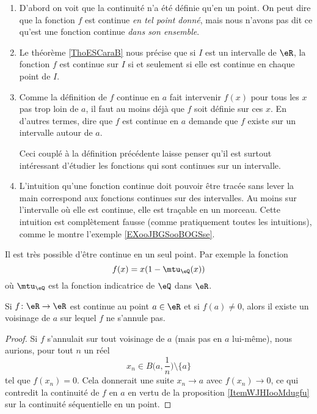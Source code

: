 \begin{enumerate}
	\item D'abord on voit que la continuité n'a été définie qu'en un point. On peut dire que la fonction \( f\) est continue \emph{en tel point donné}, mais nous n'avons pas dit ce qu'est une fonction continue \emph{dans son ensemble}.

	\item
	      Le théorème \ref{ThoESCaraB} nous précise que si \( I\) est un intervalle de \( \eR\), la fonction \( f\) est continue sur \( I\) si et seulement si elle est continue en chaque point de \( I\).

	\item Comme la définition de \( f\) continue en \( a\) fait intervenir \( f(x)\) pour tous les \( x\) pas trop loin de \( a\), il faut au moins déjà que \( f\) soit définie sur ces \( x\). En d'autres termes, dire que \( f\) est continue en \( a\) demande que \( f\) existe sur un intervalle autour de \( a\).

	      Ceci couplé à la définition précédente laisse penser qu'il est surtout intéressant d'étudier les fonctions qui sont continues sur un intervalle.

      \item L'intuition qu'une fonction continue doit pouvoir être tracée sans lever la main correspond aux fonctions continues sur des intervalles. Au moins sur l'intervalle où elle est continue, elle est traçable en un morceau. Cette intuition est complètement fausse (comme pratiquement toutes les intuitions), comme le montre l'exemple \ref{EXooJBGSooBOGSse}.
\end{enumerate}

\begin{example}     \label{EXooJBGSooBOGSse}
	Il est très possible d'être continue en un seul point. Par exemple la fonction
	\begin{equation}
		f(x)=x(1-\mtu_{\eQ}(x))
	\end{equation}
	où \( \mtu_{\eQ}\) est la fonction indicatrice de \( \eQ\) dans \( \eR\).
\end{example}

\begin{proposition}     \label{PROPooUBUAooNIxjfg}
	Si \( f\colon \eR\to \eR\) est continue au point \( a\in \eR\) et si \( f(a)\neq 0\), alors il existe un voisinage de \( a\) sur lequel \( f\) ne s'annule pas.
\end{proposition}

\begin{proof}
	Si \( f \) s'annulait sur tout voisinage de \( a\) (mais pas en \( a\) lui-même), nous aurions, pour tout \( n\) un réel
	\begin{equation}
		x_n\in B\big( a,\frac{1}{ n } \big)\setminus\{ a \}
	\end{equation}
	tel que \( f(x_n)=0\). Cela donnerait une suite \( x_n\to a\) avec \( f(x_n)\to 0\), ce qui contredit la continuité de \( f\) en \( a\) en vertu de la proposition \ref{ItemWJHIooMdugfu} sur la continuité séquentielle en un point.
\end{proof}

